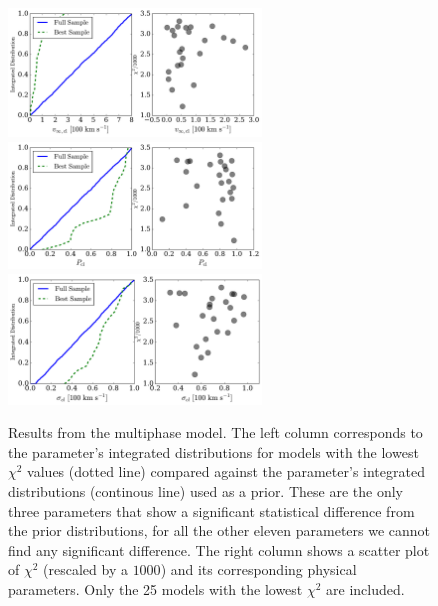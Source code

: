 \documentclass[a4,useAMS,usenatbib,usegraphicx]{mn2e}
\begin{document}
\begin{figure}
\begin{center}
  \includegraphics[width=0.6\textwidth]{vinf_cl.pdf}
  \includegraphics[width=0.6\textwidth]{P_cl.pdf}
  \includegraphics[width=0.6\textwidth]{sigma_cl.pdf}
\caption{Results from the multiphase
  model.
  The left column corresponds to the parameter's integrated distributions for
  models with the lowest $\chi^2$ values (dotted line) compared against the
  parameter's integrated distributions (continous line) used as a prior.
  These are the only three parameters that show a significant statistical difference from
  the prior distributions, for all the other eleven parameters we
  cannot find any significant difference.
  The right column shows a scatter plot of $\chi^2$ (rescaled by a $1000$)
  and its corresponding physical parameters.
  Only the  25 models with the lowest $\chi^2$ are included.
  \label{multiphaseresults}
}  
\end{center}
\end{figure}
\end{document}
